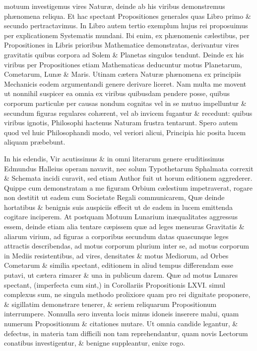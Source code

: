 \documentclass{ansarticle}
\begin{document}
motuum investigemus vires Natur\ae{}, deinde ab his viribus
demonstremus ph\ae{}nomena reliqua. Et hac spectant Propositiones
generales quas Libro primo \& secundo pertractavimus. In Libro autem
tertio exemplum hujus rei proposuimus per explicationem Systematis
mundani. Ibi enim, ex ph\ae{}nomenis c\ae{}lestibus, per Propositiones
in Libris prioribus Mathematice demonstratas, derivantur vires
gravitatis quibus corpora ad Solem \& Planetas singulos
tendunt. Deinde ex his viribus per Propositiones etiam Mathematicas
deducuntur motus Planetarum, Cometarum, Lun\ae{} \& Maris. Utinam
c\ae{}tera Natur\ae{} ph\ae{}nomena ex principiis Mechanicis eodem
argumentandi genere derivare liceret. Nam multa me movent ut nonnihil
suspicer ea omnia ex viribus quibusdam pendere posse, quibus corporum
particul\ae{} per causas nondum cognitas vel in se mutuo impelluntur
\& secundum figuras regulares coh\ae{}rent, vel ab invicem fugantur \&
recedunt: quibus viribus ignotis, Philosophi hactenus Naturam frustra
tentarunt. Spero autem quod vel huic Philosophandi modo, vel veriori
alicui, Principia hic posita lucem aliquam pr\ae{}bebunt.

In his edendis, Vir acutissimus \& in omni literarum genere
eruditissimus Edmundus Halleius operam navavit, nec solum Typothetarum
Sphalmata correxit \& Schemata incidi curavit, sed etiam Author fuit ut
horum editionem aggrederer. Quippe cum demonstratam a me figuram
Orbium c\ae{}lestium impetraverat, rogare non destitit ut eadem cum
Societate Regali communicarem, Qu\ae{} deinde hortatibus \& benignis suis
auspiciis effecit ut de eadem in lucem emittenda cogitare
inciperem. At postquam Motuum Lunarium in\ae{}qualitates aggressus essem,
deinde etiam alia tentare c\ae{}pissem qu\ae{} ad leges mensuras Gravitatis \&
aliarum virium, ad figuras a corporibus secundum datas quascunque
leges attractis describendas, ad motus corporum plurium inter se, ad
motus corporum in Mediis resistentibus, ad vires, densitates \& motus
Mediorum, ad Orbes Cometarum \& similia spectant, editionem in aliud
tempus differendam esse putavi, ut c\ae{}tera rimarer \& una in publicum
darem. Qu\ae{} ad motus Lunares spectant, (imperfecta cum sint,) in
Corollariis Propositionis LXVI. simul complexus sum, ne singula
methodo prolixiore quam pro rei dignitate proponere, \& sigillatim
demonstrare tenerer, \& seriem reliquarum Propositionum
interrumpere. Nonnulla sero inventa locis minus idoneis inserere
malui, quam numerum Propositionum \& citationes mutare. Ut omnia
candide legantur, \& defectus, in materia tam difficili non tam
reprehendantur, quam novis Lectorum conatibus investigentur, \& benigne
suppleantur, enixe rogo.
\end{document}
